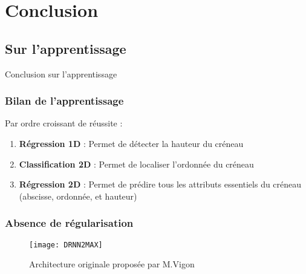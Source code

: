 
% 



\section{Conclusion}

\subsection{Sur l'apprentissage}

\begin{frame}
    \large
    \centering
    Conclusion sur l'apprentissage
\end{frame}

\begin{frame}
    \frametitle{Bilan de l'apprentissage}
    Par ordre croissant de réussite :
    \pause
    \begin{enumerate}[<+>]
        \item \textbf{Régression 1D} : Permet de détecter la hauteur du créneau %
        \item \textbf{Classification 2D} : Permet de localiser l'ordonnée du créneau %
        \item \textbf{Régression 2D} : Permet de prédire tous les attributs essentiels du créneau (abscisse, ordonnée, et hauteur)%
      \end{enumerate}
\end{frame}

\begin{frame}
    \frametitle{Absence de régularisation}
    \begin{figure}
        \texttt{[image: DRNN2MAX]}       
        \caption{Architecture originale proposée par M.Vigon}
    \end{figure}
\end{frame}

